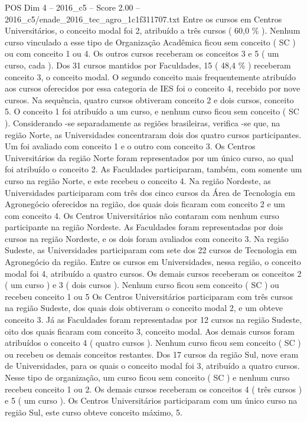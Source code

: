 \begin{textsample}{POS Dim 4 – 2016\_c5 – Score 2.00 – 2016\_c5/enade\_2016\_tec\_agro\_1c1f311707.txt}
Entre os cursos em Centros Universitários, o conceito modal foi 2, atribuído a três cursos ( 60,0 \% ).
Nenhum curso vinculado a esse tipo de Organização Acadêmica ficou sem conceito ( SC ) ou com conceito 1 ou 4.
Os outros cursos receberam os conceitos 3 e 5 ( um curso, cada ).
Dos 31 cursos mantidos por Faculdades, 15 ( 48,4 \% ) receberam conceito 3, o conceito modal.
O segundo conceito mais frequentemente atribuído aos cursos oferecidos por essa categoria de IES foi o conceito 4, recebido por nove cursos.
Na sequência, quatro cursos obtiveram conceito 2 e dois cursos, conceito 5.
O conceito 1 foi atribuído a um curso, e nenhum curso ficou sem conceito ( SC ).
Considerando -se separadamente as regiões brasileiras, verifica -se que, na região Norte, as Universidades concentraram dois dos quatro cursos participantes.
Um foi avaliado com conceito 1 e o outro com conceito 3.
Os Centros Universitários da região Norte foram representados por um único curso, ao qual foi atribuído o conceito 2.
As Faculdades participaram, também, com somente um curso na região Norte, e este recebeu o conceito 4.
Na região Nordeste, as Universidades participaram com três dos cinco cursos da Área de Tecnologia em Agronegócio oferecidos na região, dos quais dois ficaram com conceito 2 e um com conceito 4.
Os Centros Universitários não contaram com nenhum curso participante na região Nordeste.
As Faculdades foram representadas por dois cursos na região Nordeste, e os dois foram avaliados com conceito 3.
Na região Sudeste, as Universidades participaram com sete dos 22 cursos de Tecnologia em Agronegócio da região.
Entre os cursos em Universidades, nessa região, o conceito modal foi 4, atribuído a quatro cursos.
Os demais cursos receberam os conceitos 2 ( um curso ) e 3 ( dois cursos ).
Nenhum curso ficou sem conceito ( SC ) ou recebeu conceito 1 ou 5 Os Centros Universitários participaram com três cursos na região Sudeste, dos quais dois obtiveram o conceito modal 2, e um obteve conceito 3.
Já as Faculdades foram representadas por 12 cursos na região Sudeste, oito dos quais ficaram com conceito 3, conceito modal.
Aos demais cursos foram atribuídos o conceito 4 ( quatro cursos ).
Nenhum curso ficou sem conceito ( SC ) ou recebeu os demais conceitos restantes.
Dos 17 cursos da região Sul, nove eram de Universidades, para os quais o conceito modal foi 3, atribuído a quatro cursos.
Nesse tipo de organização, um curso ficou sem conceito ( SC ) e nenhum curso recebeu conceito 1 ou 2.
Os demais cursos receberam os conceitos 4 ( três cursos ) e 5 ( um curso ).
Os Centros Universitários participaram com um único curso na região Sul, este curso obteve conceito máximo, 5.

\end{textsample}
